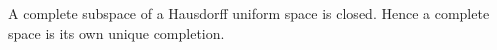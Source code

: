 A complete subspace of a Hausdorff uniform space is closed. Hence a complete space is its own unique completion.
